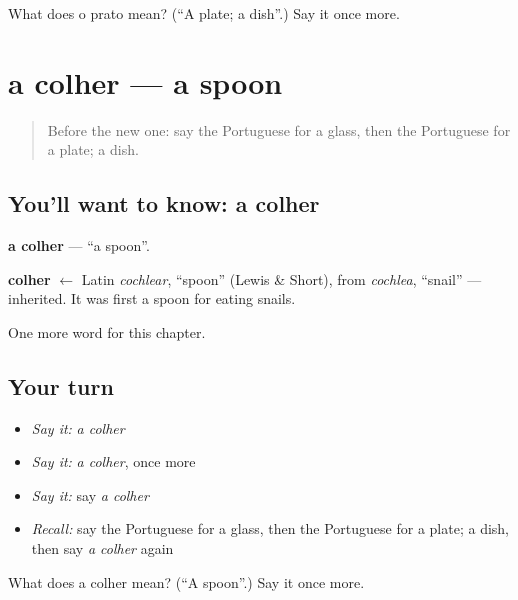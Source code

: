 \begin{tcolorbox}[breakable,colback=teal!4,colframe=teal!35!black,title={Before you move on}]
What does o prato mean? (\textquotedblleft{}A plate; a dish\textquotedblright{}.) Say it once more.
\end{tcolorbox}
\section[a colher]{a colher — a spoon}

\label{lesson:PT-C51-colher}



\begin{quote}
Before the new one: say the Portuguese for a glass, then the Portuguese for a plate; a dish.
\end{quote}

\subsection*{You'll want to know: a colher}
\textbf{a colher} — \textquotedblleft{}a spoon\textquotedblright{}.

\begin{cousinweb}
\textbf{colher} $\leftarrow$ Latin \emph{cochlear}, \textquotedblleft{}spoon\textquotedblright{} (Lewis \& Short), from \emph{cochlea}, \textquotedblleft{}snail\textquotedblright{} — inherited. It was first a spoon for eating snails.
\end{cousinweb}

\begin{grammarlens}[title={What you've built}]
One more word for this chapter.
\end{grammarlens}

\subsection*{Your turn}
\begin{itemize}
\raggedright
  \item \emph{Say it:} \emph{a colher}
  \item \emph{Say it:} \emph{a colher}, once more
  \item \emph{Say it:} say \emph{a colher}
  \item \emph{Recall:} say the Portuguese for a glass, then the Portuguese for a plate; a dish, then say \emph{a colher} again
\end{itemize}

\begin{tcolorbox}[breakable,colback=teal!4,colframe=teal!35!black,title={Before you move on}]
What does a colher mean? (\textquotedblleft{}A spoon\textquotedblright{}.) Say it once more.
\end{tcolorbox}
